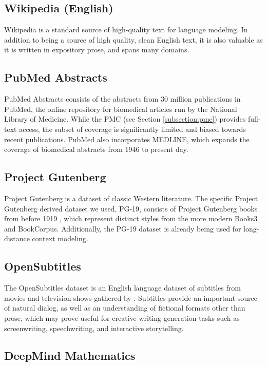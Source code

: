 \subsection{Wikipedia (English)}

Wikipedia is a standard source of high-quality text for language modeling. In addition to being a source of high quality, clean English text, it is also valuable as it is written in expository prose, and spans many domains.

\subsection{PubMed Abstracts}

PubMed Abstracts consists of the abstracts from 30 million publications in PubMed, the online repository for biomedical articles run by the National Library of Medicine. While the PMC (see Section \ref{subsection:pmc}) provides full-text access, the subset of coverage is significantly limited and biased towards recent publications. PubMed also incorporates MEDLINE, which expands the coverage of biomedical abstracts from 1946 to present day.

\subsection{Project Gutenberg}

Project Gutenberg is a dataset of  classic Western literature. The specific Project Gutenberg derived dataset we used, PG-19, consists of Project Gutenberg books from before 1919 \citep{PG19}, which represent distinct styles from the more modern Books3 and BookCorpus. Additionally, the PG-19 dataset is already being used for long-distance context modeling.

\subsection{OpenSubtitles}

The OpenSubtitles dataset is an English language dataset of subtitles from movies and television shows gathered by \citet{OpenSubtitles}. Subtitles provide an important source of natural dialog, as well as an understanding of fictional formats other than prose, which may prove useful for creative writing generation tasks such as screenwriting, speechwriting, and interactive storytelling.

\subsection{DeepMind Mathematics}

